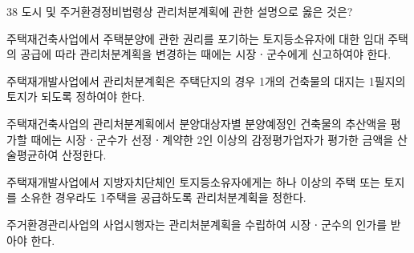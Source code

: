 \begin{question}{38}
도시 및 주거환경정비법령상 관리처분계획에 관한 설명으로 옳은 것은?
\begin{choices}
  \item 주택재건축사업에서 주택분양에 관한 권리를 포기하는 토지등소유자에 대한 임대 주택의 공급에 따라 관리처분계획을 변경하는 때에는 시장ㆍ군수에게 신고하여야 한다.
  \item 주택재개발사업에서 관리처분계획은 주택단지의 경우 1개의 건축물의 대지는 1필지의 토지가 되도록 정하여야 한다.
  \item 주택재건축사업의 관리처분계획에서 분양대상자별 분양예정인 건축물의 추산액을 평가할 때에는 시장ㆍ군수가 선정ㆍ계약한 2인 이상의 감정평가업자가 평가한 금액을 산술평균하여 산정한다.
  \item 주택재개발사업에서 지방자치단체인 토지등소유자에게는 하나 이상의 주택 또는 토지를 소유한 경우라도 1주택을 공급하도록 관리처분계획을 정한다.
  \item 주거환경관리사업의 사업시행자는 관리처분계획을 수립하여 시장ㆍ군수의 인가를 받아야 한다.
\end{choices}
\end{question}
